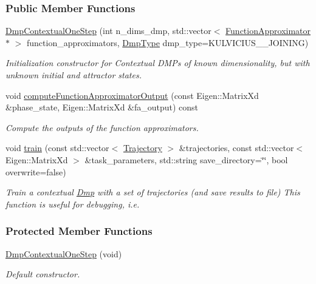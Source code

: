 \subsubsection*{Public Member Functions}
\begin{DoxyCompactItemize}
\item 
\hyperlink{classDmpBbo_1_1DmpContextualOneStep_a44bfebbc35616aefc17e43d4319e027e}{Dmp\+Contextual\+One\+Step} (int n\+\_\+dims\+\_\+dmp, std\+::vector$<$ \hyperlink{classDmpBbo_1_1FunctionApproximator}{Function\+Approximator} $\ast$ $>$ function\+\_\+approximators, \hyperlink{group__Dmps_gaccba8d09ec99ae66e469b3511bb232a4}{Dmp\+Type} dmp\+\_\+type=K\+U\+L\+V\+I\+C\+I\+U\+S\+\_\+\_\+\+J\+O\+I\+N\+I\+N\+G)
\begin{DoxyCompactList}\small\item\em Initialization constructor for Contextual D\+M\+Ps of known dimensionality, but with unknown initial and attractor states. \end{DoxyCompactList}\item 
void \hyperlink{classDmpBbo_1_1DmpContextualOneStep_a89078b732a4579130e24e3bc59c1713c}{compute\+Function\+Approximator\+Output} (const Eigen\+::\+Matrix\+Xd \&phase\+\_\+state, Eigen\+::\+Matrix\+Xd \&fa\+\_\+output) const 
\begin{DoxyCompactList}\small\item\em Compute the outputs of the function approximators. \end{DoxyCompactList}\item 
void \hyperlink{classDmpBbo_1_1DmpContextualOneStep_abc482e476a06b3c3c3816472f309dbd3}{train} (const std\+::vector$<$ \hyperlink{classDmpBbo_1_1Trajectory}{Trajectory} $>$ \&trajectories, const std\+::vector$<$ Eigen\+::\+Matrix\+Xd $>$ \&task\+\_\+parameters, std\+::string save\+\_\+directory=\char`\"{}\char`\"{}, bool overwrite=false)
\begin{DoxyCompactList}\small\item\em Train a contextual \hyperlink{classDmpBbo_1_1Dmp}{Dmp} with a set of trajectories (and save results to file) This function is useful for debugging, i.\+e. \end{DoxyCompactList}\end{DoxyCompactItemize}
\subsubsection*{Protected Member Functions}
\begin{DoxyCompactItemize}
\item 
\hyperlink{classDmpBbo_1_1DmpContextualOneStep_a8656352673dd315b46ef41b269c4051d}{Dmp\+Contextual\+One\+Step} (void)
\begin{DoxyCompactList}\small\item\em Default constructor. \end{DoxyCompactList}\end{DoxyCompactItemize}
